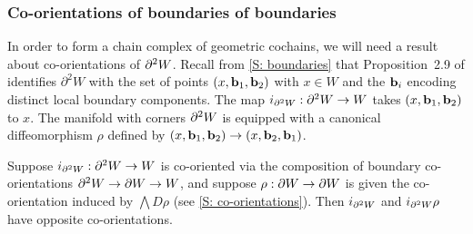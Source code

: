 \begin{example}
\begin{comment}
\red{TO DO SOMEWHERE: It will be convenient to show that $g:W^0\to M$ with this co-orientation is the pullback of $M^0\into M$ (co-oriented as defined here) and $g:W\to M$ and similarly for $g:W^\pm\to M$. Also need to rewrite things in other places as $M^0$, $M^\pm$, etc instead of always writing $\varphi^{-1}((\infty,0])$ etc. Also need to show that $\bd W^0=-(\bd W)^0$, which should follow from the Leibniz rule and the first thing the previous sentence.}
\end{comment}
\end{example}



\subsubsection{Co-orientations of boundaries of boundaries} In order to form a chain complex of geometric cochains, we will need a result about co-orientations of $\partial^2W$. Recall from \cref{S: boundaries} that Proposition~2.9 of \cite{Joy12} identifies $\partial^2 W$ with the set of points $(x,\mathbf{b}_1,\mathbf{b}_2)$ with $x\in W$ and the $\mathbf{b}_i$ encoding distinct local boundary components.  The map $i_{\partial^2W}:\partial^2W\to W$ takes $(x,\mathbf{b}_1,\mathbf{b}_2)$ to $x$.
The manifold with corners $\partial^2W$ is equipped with a canonical diffeomorphism $\rho$ defined by $(x,\mathbf{b}_1,\mathbf{b}_2)\to (x,\mathbf{b}_2,\mathbf{b}_1)$.



\begin{lemma}\label{L: boundary2}
Suppose $i_{\partial^2W}:\partial^2W\to W$ is co-oriented via the composition of boundary co-orientations $\partial^2W\to \partial W\to W$, and suppose $\rho:\partial W\to \partial W$ is given the co-orientation induced by  $\bigwedge D\rho$ (see \cref{S: co-orientations}). Then $i_{\partial^2W}$ and $i_{\partial^2W}\rho$ have opposite co-orientations.
\end{lemma}

